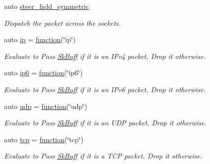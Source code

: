 \begin{DoxyCompactItemize}
auto \hyperlink{namespacepfq_1_1lang_1_1anonymous__namespace_02default_8hpp_03_a422c7bafe8240549d193903890f9ec48}{steer\+\_\+field\+\_\+symmetric}
\begin{DoxyCompactList}\small\item\em Dispatch the packet across the sockets. \end{DoxyCompactList}\item 
auto \hyperlink{namespacepfq_1_1lang_1_1anonymous__namespace_02default_8hpp_03_a738d1b52bf88feb4f7b1a17b97cdc8df}{ip} = \hyperlink{namespacepfq_1_1lang_a1a4638059d700ae08d0ca63886ff2bb3}{function}(\char`\"{}ip\char`\"{})
\begin{DoxyCompactList}\small\item\em Evaluate to {\ttfamily Pass} \hyperlink{structpfq_1_1lang_1_1SkBuff}{Sk\+Buff} if it is an I\+Pv4 packet, {\ttfamily Drop} it otherwise. \end{DoxyCompactList}\item 
auto \hyperlink{namespacepfq_1_1lang_1_1anonymous__namespace_02default_8hpp_03_a5df1535f3c8090b714928b77f5a9cf18}{ip6} = \hyperlink{namespacepfq_1_1lang_a1a4638059d700ae08d0ca63886ff2bb3}{function}(\char`\"{}ip6\char`\"{})
\begin{DoxyCompactList}\small\item\em Evaluate to {\ttfamily Pass} \hyperlink{structpfq_1_1lang_1_1SkBuff}{Sk\+Buff} if it is an I\+Pv6 packet, {\ttfamily Drop} it otherwise. \end{DoxyCompactList}\item 
auto \hyperlink{namespacepfq_1_1lang_1_1anonymous__namespace_02default_8hpp_03_a0b8b927aad3be7034521ebde0dabf7d3}{udp} = \hyperlink{namespacepfq_1_1lang_a1a4638059d700ae08d0ca63886ff2bb3}{function}(\char`\"{}udp\char`\"{})
\begin{DoxyCompactList}\small\item\em Evaluate to {\ttfamily Pass} \hyperlink{structpfq_1_1lang_1_1SkBuff}{Sk\+Buff} if it is an U\+DP packet, {\ttfamily Drop} it otherwise. \end{DoxyCompactList}\item 
auto \hyperlink{namespacepfq_1_1lang_1_1anonymous__namespace_02default_8hpp_03_a5b8ca91a33a120e7e0807e63c8b51b28}{tcp} = \hyperlink{namespacepfq_1_1lang_a1a4638059d700ae08d0ca63886ff2bb3}{function}(\char`\"{}tcp\char`\"{})
\begin{DoxyCompactList}\small\item\em Evaluate to {\ttfamily Pass} \hyperlink{structpfq_1_1lang_1_1SkBuff}{Sk\+Buff} if it is a T\+CP packet, {\ttfamily Drop} it otherwise. \end{DoxyCompactList}\item 

\end{DoxyCompactItemize}
